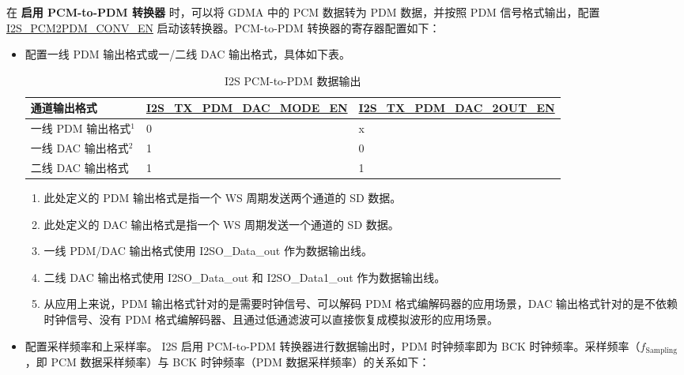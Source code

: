 \documentclass[main\_\_CN.tex]{subfiles}
\begin{document}
在 \textbf{启用 PCM-to-PDM 转换器} 时，可以将 GDMA 中的 PCM 数据转为 PDM 数据，并按照 PDM 信号格式输出，配置 \hyperref[fielddesc:I2SPCM2PDMCONVEN]{I2S\_PCM2PDM\_CONV\_EN} 启动该转换器。PCM-to-PDM 转换器的寄存器配置如下：

\begin{itemize}
    \item 配置一线 PDM 输出格式或一/二线 DAC 输出格式，具体如下表。
\begin{table}[H]
    \centering
    \caption{I2S PCM-to-PDM 数据输出}
    \label{tab:i2s-pcm-pdm-output-mode}
    \begin{tabular}{|p{4.3cm}|R{5.0cm}|R{4.8cm}|}
    \hline
    \textbf{通道输出格式}&\textbf{\hyperref[fielddesc:I2STXPDMDACMODEEN]{I2S\_TX\_PDM\_DAC\_MODE\_EN}} & \textbf{\hyperref[fielddesc:I2STXPDMDAC2OUTEN]{I2S\_TX\_PDM\_DAC\_2OUT\_EN}}\\ \hline
    一线 PDM 输出格式\hyperref[note-1]{$^1$}& 0 & x \\ \hline
    一线 DAC 输出格式\hyperref[note-2]{$^2$} &1   & 0  \\ \hline 
    二线 DAC 输出格式 & 1 & 1 \\ \hline
    \end{tabular}
\end{table}

\vspace{-1em}
\begin{tiplisting}
\vspace{-2em}
\begin{enumerate}
    \item \label{note-1} 此处定义的 PDM 输出格式是指一个 WS 周期发送两个通道的 SD 数据。
    \item \label{note-2} 此处定义的 DAC 输出格式是指一个 WS 周期发送一个通道的 SD 数据。
    \item 一线 PDM/DAC 输出格式使用 I2SO\_Data\_out 作为数据输出线。
    \item 二线 DAC 输出格式使用 I2SO\_Data\_out 和 I2SO\_Data1\_out 作为数据输出线。
    \item 从应用上来说，PDM 输出格式针对的是需要时钟信号、可以解码 PDM 格式编解码器的应用场景，DAC 输出格式针对的是不依赖时钟信号、没有 PDM 格式编解码器、且通过低通滤波可以直接恢复成模拟波形的应用场景。
\end{enumerate}

\end{tiplisting}
\vspace{-1em}

    \item 配置采样频率和上采样率。\newline
    I2S 启用 PCM-to-PDM 转换器进行数据输出时，PDM 时钟频率即为 BCK 时钟频率。采样频率（$f_{\textrm{Sampling}}$，即 PCM 数据采样频率）与 BCK 时钟频率（PDM 数据采样频率）的关系如下：
    

\end{itemize}
\end{document}
